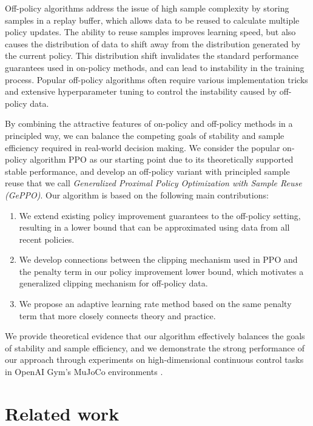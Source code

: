 \documentclass{article}
\begin{document}
Off-policy algorithms address the issue of high sample complexity by storing samples in a replay buffer, which allows data to be reused to calculate multiple policy updates. The ability to reuse samples improves learning speed, but also causes the distribution of data to shift away from the distribution generated by the current policy. This distribution shift invalidates the standard performance guarantees used in on-policy methods, and can lead to instability in the training process. Popular off-policy algorithms often require various implementation tricks and extensive hyperparameter tuning to control the instability caused by off-policy data.

By combining the attractive features of on-policy and off-policy methods in a principled way, we can balance the competing goals of stability and sample efficiency required in real-world decision making. We consider the popular on-policy algorithm PPO as our starting point due to its theoretically supported stable performance, and develop an off-policy variant with principled sample reuse that we call \emph{Generalized Proximal Policy Optimization with Sample Reuse (GePPO)}. Our algorithm is based on the following main contributions:
\begin{enumerate}
\item We extend existing policy improvement guarantees to the off-policy setting, resulting in a lower bound that can be approximated using data from all recent policies.
\item We develop connections between the clipping mechanism used in PPO and the penalty term in our policy improvement lower bound, which motivates a generalized clipping mechanism for off-policy data.
\item We propose an adaptive learning rate method based on the same penalty term that more closely connects theory and practice.
\end{enumerate}

We provide theoretical evidence that our algorithm effectively balances the goals of stability and sample efficiency, and we demonstrate the strong performance of our approach through experiments on high-dimensional continuous control tasks in OpenAI Gym's MuJoCo environments \citep{brockman_2016,todorov_2012}. 


\section{Related work}
\end{document}
